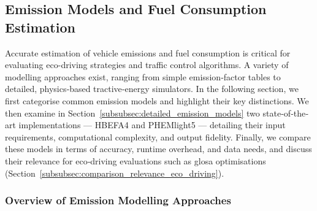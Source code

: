 
\subsection{Emission Models and Fuel Consumption Estimation}
\label{subsec:emission_models_fuel_estimation}

Accurate estimation of vehicle emissions and fuel consumption is critical for evaluating eco-driving strategies and traffic control algorithms. A variety of modelling approaches exist, ranging from simple emission‐factor tables to detailed, physics‐based tractive‐energy simulators. In the following section, we first categorise common emission models and highlight their key distinctions. We then examine in Section~\ref{subsubsec:detailed_emission_models} two state‐of‐the‐art implementations --- HBEFA4 and PHEMlight5 --- detailing their input requirements, computational complexity, and output fidelity. Finally, we compare these models in terms of accuracy, runtime overhead, and data needs, and discuss their relevance for eco‐driving evaluations such as \ac{glosa} optimisations (Section~\ref{subsubsec:comparison_relevance_eco_driving}).  

\subsubsection{Overview of Emission Modelling Approaches}
\label{subsubsec:overview_emission_models}

